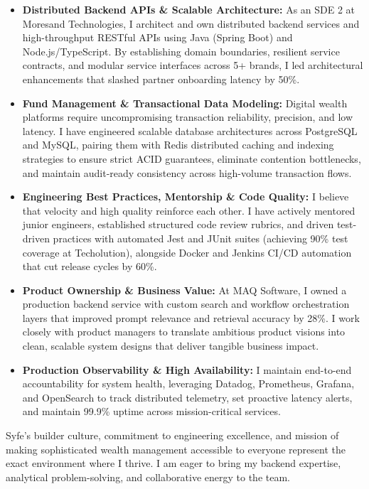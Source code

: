 \documentclass[a4paper,10pt]{article}
\begin{document}
\begin{itemize}[leftmargin=12pt, itemsep=3pt, parsep=0pt]
  \item \textbf{Distributed Backend APIs \& Scalable Architecture:} As an SDE 2 at Moresand Technologies, I architect and own distributed backend services and high-throughput RESTful APIs using Java (Spring Boot) and Node.js/TypeScript. By establishing domain boundaries, resilient service contracts, and modular service interfaces across 5+ brands, I led architectural enhancements that slashed partner onboarding latency by 50\%.
  \item \textbf{Fund Management \& Transactional Data Modeling:} Digital wealth platforms require uncompromising transaction reliability, precision, and low latency. I have engineered scalable database architectures across PostgreSQL and MySQL, pairing them with Redis distributed caching and indexing strategies to ensure strict ACID guarantees, eliminate contention bottlenecks, and maintain audit-ready consistency across high-volume transaction flows.
  \item \textbf{Engineering Best Practices, Mentorship \& Code Quality:} I believe that velocity and high quality reinforce each other. I have actively mentored junior engineers, established structured code review rubrics, and driven test-driven practices with automated Jest and JUnit suites (achieving 90\% test coverage at Techolution), alongside Docker and Jenkins CI/CD automation that cut release cycles by 60\%.
  \item \textbf{Product Ownership \& Business Value:} At MAQ Software, I owned a production backend service with custom search and workflow orchestration layers that improved prompt relevance and retrieval accuracy by 28\%. I work closely with product managers to translate ambitious product visions into clean, scalable system designs that deliver tangible business impact.
  \item \textbf{Production Observability \& High Availability:} I maintain end-to-end accountability for system health, leveraging Datadog, Prometheus, Grafana, and OpenSearch to track distributed telemetry, set proactive latency alerts, and maintain 99.9\% uptime across mission-critical services.
\end{itemize}

\vspace{6pt}
Syfe's builder culture, commitment to engineering excellence, and mission of making sophisticated wealth management accessible to everyone represent the exact environment where I thrive. I am eager to bring my backend expertise, analytical problem-solving, and collaborative energy to the team.
\end{document}
